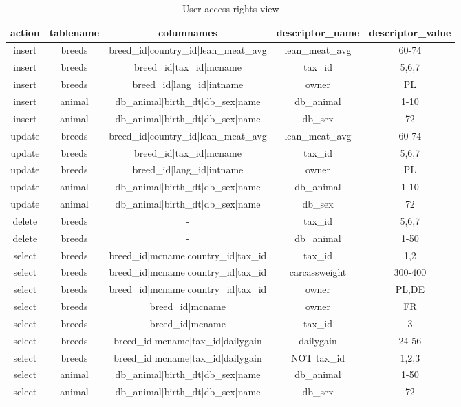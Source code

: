 \begin{itemize}
\newpage
\begin{center}%
\begin{table}[h]
\begin{center}\begin{tabular}{|c|c|c|c|c|}
\hline 
action&tablename&columnames&descriptor\_name&descriptor\_value\tabularnewline
\hline
\hline insert & breeds & breed\_id|country\_id|lean\_meat\_avg		& lean\_meat\_avg 	& 60-74 \\
\hline insert & breeds & breed\_id|tax\_id|mcname 			& tax\_id 		& 5,6,7\\
\hline insert & breeds & breed\_id|lang\_id|intname 			& owner 		& PL\\
\hline insert & animal & db\_animal|birth\_dt|db\_sex|name 		& db\_animal 		& 1-10\\
\hline insert & animal & db\_animal|birth\_dt|db\_sex|name 		& db\_sex 		& 72\\
\hline update & breeds & breed\_id|country\_id|lean\_meat\_avg		& lean\_meat\_avg 	& 60-74   \\
\hline update & breeds & breed\_id|tax\_id|mcname			& tax\_id         	& 5,6,7    \\
\hline update & breeds & breed\_id|lang\_id|intname            		& owner           	& PL     \\
\hline update & animal & db\_animal|birth\_dt|db\_sex|name     		& db\_animal      	& 1-10   \\
\hline update & animal & db\_animal|birth\_dt|db\_sex|name      	& db\_sex        	& 72     \\
\hline delete & breeds & -						& tax\_id		& 5,6,7  \\
\hline delete & breeds & -						& db\_animal		& 1-50  \\
\hline select & breeds & breed\_id|mcname|country\_id|tax\_id 		& tax\_id 		& 1,2\\
\hline select & breeds & breed\_id|mcname|country\_id|tax\_id 		& carcassweight 	& 300-400\\
\hline select & breeds & breed\_id|mcname|country\_id|tax\_id 		& owner 		& PL,DE\\
\hline select & breeds & breed\_id|mcname 				& owner 		& FR\\
\hline select & breeds & breed\_id|mcname 				& tax\_id 		& 3\\
\hline select & breeds & breed\_id|mcname|tax\_id|dailygain 		& dailygain 		& 24-56\\
\hline select & breeds & breed\_id|mcname|tax\_id|dailygain 		& NOT tax\_id 		& 1,2,3\\
\hline select & animal & db\_animal|birth\_dt|db\_sex|name 		& db\_animal 		& 1-50\\
\hline select & animal & db\_animal|birth\_dt|db\_sex|name 		& db\_sex 		& 72\\
\hline
\end{tabular}\end{center}
\caption{User access rights view}\label{userarview}
\end{table}
\end{center}
 \end{itemize} 

